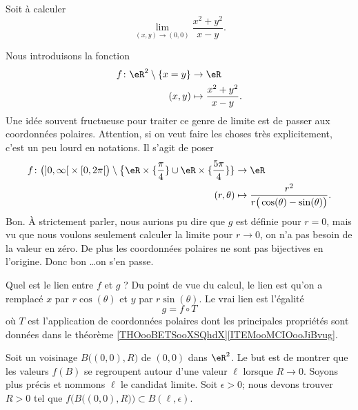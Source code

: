 \begin{example}     \label{EXooSDHDooJzDioW}
	Soit à calculer
	\begin{equation}
		\lim_{(x,y)\to(0,0)}\frac{ x^2+y^2 }{ x-y }.
	\end{equation}

	Nous introduisons la fonction
	\begin{equation}
		\begin{aligned}
			f\colon \eR^2\setminus\{ x=y \} & \to \eR                          \\
			(x,y)                           & \mapsto \frac{ x^2+y^2 }{ x-y }.
		\end{aligned}
	\end{equation}
	Une idée souvent fructueuse pour traiter ce genre de limite est de passer aux coordonnées polaires. Attention, si on veut faire les choses très explicitement, c'est un peu lourd en notations. Il s'agit de poser
	\begin{equation}
		\begin{aligned}
			f\colon \big( \mathopen] 0 , \infty \mathclose[\times\mathopen[ 0 , 2\pi \mathclose[ \big)\setminus\big\{ \eR\times\{ \frac{ \pi }{ 4 }\}\cup\eR\times \{ \frac{ 5\pi }{ 4 } \} \} & \to \eR                                                         \\
			(r,\theta)                                                                                                                                                                         & \mapsto \frac{ r^2 }{ r\big( \cos(\theta)-\sin(\theta) \big) }.
		\end{aligned}
	\end{equation}
	Bon. À strictement parler, nous aurions pu dire que \( g\) est définie pour \( r=0\), mais vu que nous voulons seulement calculer la limite pour \( r\to 0\), on n'a pas besoin de la valeur en zéro. De plus les coordonnées polaires ne sont pas bijectives en l'origine. Donc bon \ldots on s'en passe.

	Quel est le lien entre \( f\) et \( g \) ? Du point de vue du calcul, le lien est qu'on a remplacé \( x\) par \( r\cos(\theta)\) et \( y\) par \( r\sin(\theta)\). Le vrai lien est l'égalité
	\begin{equation}
		g=f\circ T
	\end{equation}
	où \( T\) est l'application de coordonnées polaires dont les principales propriétés sont données dans le théorème \ref{THOooBETSooXSQhdX}\ref{ITEMooMCIOooJiBvug}.

	Soit un voisinage \( B\big( (0,0), R \big)\) de \( (0,0)\) dans \( \eR^2\). Le but est de montrer que les valeurs \( f(B)\) se regroupent autour d'une valeur \( \ell\) lorsque \( R\to 0\). Soyons plus précis et nommons \( \ell\) le candidat limite. Soit \( \epsilon>0\); nous devons trouver \( R>0\) tel que \( f\Big( B\big( (0,0),R \big) \Big)\subset B(\ell,\epsilon)\).


\end{example}
